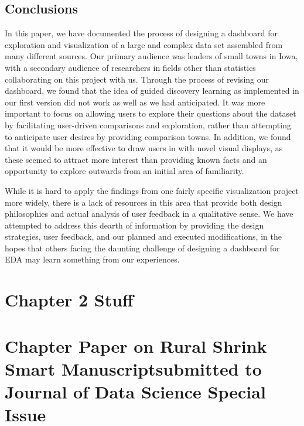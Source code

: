 \documentclass[print]{nuthesis}
\begin{document}
\hypertarget{conclusions}{%
\section{Conclusions}\label{conclusions}}

In this paper, we have documented the process of designing a dashboard for exploration and visualization of a large and complex data set assembled from many different sources. Our primary audience was leaders of small towns in Iowa, with a secondary audience of researchers in fields other than statistics collaborating on this project with us. Through the process of revising our dashboard, we found that the idea of guided discovery learning as implemented in our first version did not work as well as we had anticipated. It was more important to focus on allowing users to explore their questions about the dataset by facilitating user-driven comparisons and exploration, rather than attempting to anticipate user desires by providing comparison towns. In addition, we found that it would be more effective to draw users in with novel visual displays, as these seemed to attract more interest than providing known facts and an opportunity to explore outwards from an initial area of familiarity.

While it is hard to apply the findings from one fairly specific visualization project more widely, there is a lack of resources in this area that provide both design philosophies and actual analysis of user feedback in a qualitative sense. We have attempted to address this dearth of information by providing the design strategies, user feedback, and our planned and executed modifications, in the hopes that others facing the daunting challenge of designing a dashboard for EDA may learn something from our experiences.

\hypertarget{math-sci}{%
\chapter{Chapter 2 Stuff}\label{math-sci}}

\hypertarget{chapter-paper-on-rural-shrink-smart-manuscriptsubmitted-to-journal-of-data-science-special-issue}{%
\chapter{Chapter Paper on Rural Shrink Smart Manuscriptsubmitted to Journal of Data Science Special Issue}\label{chapter-paper-on-rural-shrink-smart-manuscriptsubmitted-to-journal-of-data-science-special-issue}}
\end{document}
